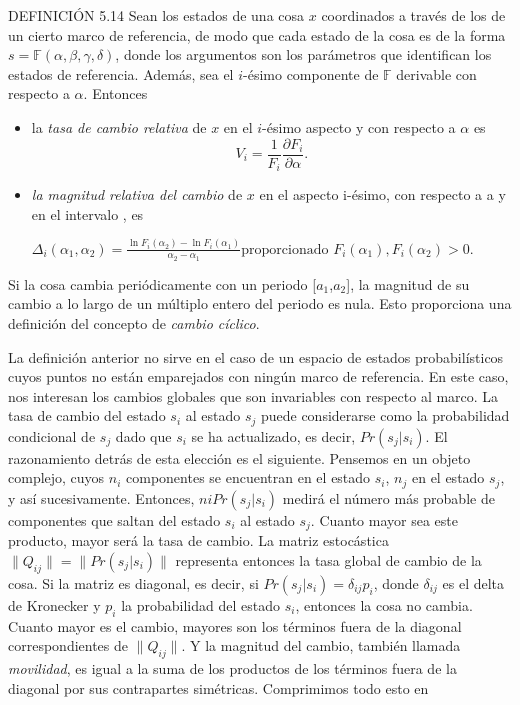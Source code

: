 \begin{justifying}
    DEFINICIÓN 5.14 Sean los estados de una cosa $x$ coordinados a través de los de un cierto marco de referencia, de modo que cada estado de la cosa es de la forma $s=\mathbb{F}(\alpha, \beta, \gamma, \delta)$, donde los argumentos son los parámetros que identifican los estados de referencia. Además, sea el $i$-ésimo componente de $\mathbb{F}$ derivable con respecto a $\alpha$. Entonces
    \begin{itemize}
        \item[(i)] la \textit{tasa de cambio relativa} de $x$ en el $i$-ésimo aspecto y con respecto a $\alpha$ es
            \[
                V_i = \frac{1}{F_i} \frac{\partial F_i}{\partial \alpha}.
            \]    
        \item[(ii)] \textit{la magnitud relativa del cambio} de $x$ en el aspecto i-ésimo, con respecto a a y en el intervalo , es
        \begin{center}
            $
                \Delta_i(\alpha_1, \alpha_2) = \frac{\ln F_i(\alpha_2) - \ln F_i(\alpha_1)}{\alpha_2 - \alpha_1}
                \text{proporcionado } F_i(\alpha_1), F_i(\alpha_2) > 0.
            $
        \end{center} 
    \end{itemize}

    Si la cosa cambia periódicamente con un periodo [$a_1$,$a_2$], la magnitud de su
    cambio a lo largo de un múltiplo entero del periodo es nula. Esto proporciona una
    definición del concepto de \textit{cambio cíclico}.

    La definición anterior no sirve en el caso de un espacio de estados probabilísticos 
    cuyos puntos no están emparejados con ningún marco de referencia. En este caso, nos interesan 
    los cambios globales que son invariables con respecto al marco. La tasa de cambio del estado $s_i$ 
    al estado $s_j$ puede considerarse como la probabilidad condicional de $s_j$ dado que $s_i$ se ha actualizado, 
    es decir, $Pr(s_j|s_i)$. El razonamiento detrás de esta elección es el siguiente. Pensemos en un objeto 
    complejo, cuyos $n_i$ componentes se encuentran en el estado $s_i$, $n_j$ en el estado $s_j$, y así sucesivamente. 
    Entonces, $niPr(s_j|s_i)$ medirá el número más probable de componentes que saltan del estado $s_i$ al estado $s_j$. 
    Cuanto mayor sea este producto, mayor será la tasa de cambio. La matriz estocástica $\lVert Q_{ij} \rVert = \lVert Pr(s_j|s_i) \rVert$
    representa entonces la tasa global de cambio de la cosa. Si la matriz es diagonal, es decir, si $Pr(s_j|s_i) = \delta _{ij}p_i$, 
    donde $\delta _{ij}$ es el delta de Kronecker y $p_i$ la probabilidad del estado $s_i$, entonces la cosa no cambia. Cuanto mayor es 
    el cambio, mayores son los términos fuera de la diagonal correspondientes de $\lVert Q_{ij} \rVert$. Y la magnitud del 
    cambio, también llamada \textit{movilidad}, es igual a la suma de los productos de los términos fuera de la diagonal 
    por sus contrapartes simétricas. Comprimimos todo esto en


\end{justifying}
